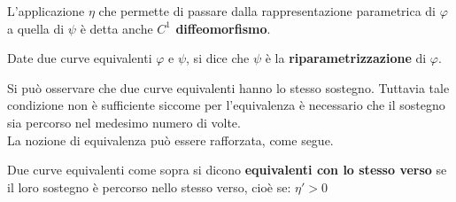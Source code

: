 \begin{definition}
    L'applicazione $\eta$ che permette di passare dalla rappresentazione parametrica di $\varphi$ a quella di $\psi$ è detta anche \textbf{$C^1$ diffeomorfismo}.
\end{definition}
\begin{definition}
    Date due curve equivalenti $\varphi$ e $\psi$, si dice che $\psi$ è la \textbf{riparametrizzazione} di $\varphi$.
\end{definition}
Si può osservare che due curve equivalenti hanno lo stesso sostegno. Tuttavia tale condizione non è sufficiente siccome per l'equivalenza è necessario che il sostegno sia percorso nel medesimo numero di volte.\\
La nozione di equivalenza può essere rafforzata, come segue.
\begin{definition}
    Due curve equivalenti come sopra si dicono \textbf{equivalenti con lo stesso verso} se il loro sostegno è percorso nello stesso verso, cioè se: $\eta'>0$
\end{definition}

